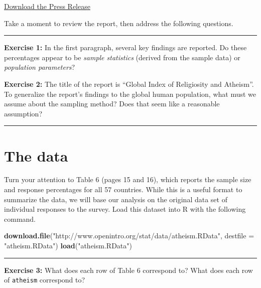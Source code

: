 \documentclass[]{book}
\newenvironment{Shaded}{\begin{snugshade}}{\end{snugshade}}
\newcommand{\DataTypeTok}[1]{\textcolor[rgb]{0.13,0.29,0.53}{#1}}
\newcommand{\KeywordTok}[1]{\textcolor[rgb]{0.13,0.29,0.53}{\textbf{#1}}}
\newcommand{\NormalTok}[1]{#1}
\newcommand{\StringTok}[1]{\textcolor[rgb]{0.31,0.60,0.02}{#1}}
\theoremstyle{definition}
\theoremstyle{definition}
\theoremstyle{definition}
\theoremstyle{remark}
\begin{document}
\href{https://canvas.northwestern.edu/files/5047539/download?download_frd=1}{Download
the Press Release}

Take a moment to review the report, then address the following
questions.

\begin{center}\rule{0.5\linewidth}{\linethickness}\end{center}

\textbf{Exercise 1:} In the first paragraph, several key findings are
reported. Do these percentages appear to be \emph{sample statistics}
(derived from the sample data) or \emph{population parameters}?

\textbf{Exercise 2:} The title of the report is ``Global Index of
Religiosity and Atheism''. To generalize the report's findings to the
global human population, what must we assume about the sampling method?
Does that seem like a reasonable assumption?

\begin{center}\rule{0.5\linewidth}{\linethickness}\end{center}

\hypertarget{the-data-3}{%
\section{The data}\label{the-data-3}}

Turn your attention to Table 6 (pages 15 and 16), which reports the
sample size and response percentages for all 57 countries. While this is
a useful format to summarize the data, we will base our analysis on the
original data set of individual responses to the survey. Load this
dataset into R with the following command.

\begin{Shaded}
\begin{Highlighting}[]
\KeywordTok{download.file}\NormalTok{(}\StringTok{"http://www.openintro.org/stat/data/atheism.RData"}\NormalTok{, }\DataTypeTok{destfile =} \StringTok{"atheism.RData"}\NormalTok{)}
\KeywordTok{load}\NormalTok{(}\StringTok{"atheism.RData"}\NormalTok{)}
\end{Highlighting}
\end{Shaded}

\begin{center}\rule{0.5\linewidth}{\linethickness}\end{center}

\textbf{Exercise 3:} What does each row of Table 6 correspond to? What
does each row of \texttt{atheism} correspond to?
\end{document}
